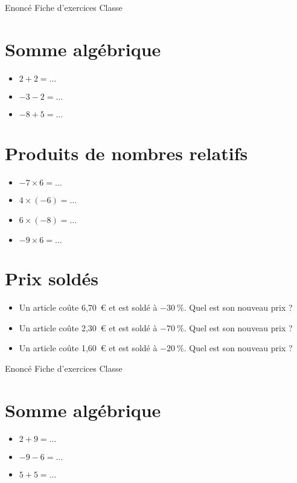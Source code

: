 \documentclass[a4paper,11pt,fleqn]{article}
\begin{document}
\pagestyle{empty}


{Enoncé} \hfill {\huge Fiche d'exercices } \hfill {Classe}

\section{Somme algébrique}
\begin{itemize}

  \item $2 +2=\ldots$
  \item $-3 -2=\ldots$
  \item $-8 +5=\ldots$
\end{itemize}


\section{Produits de nombres relatifs}
\begin{itemize}

  \item $-7\times6=\ldots$
  \item $4\times(-6)=\ldots$
  \item $6\times(-8)=\ldots$
  \item $-9\times6=\ldots$
\end{itemize}


\section{Prix soldés}
\begin{itemize}

  \item Un article coûte 6,70~€ et est soldé à $-30~\%$. Quel est son nouveau prix ?
  \item Un article coûte 2,30~€ et est soldé à $-70~\%$. Quel est son nouveau prix ?
  \item Un article coûte 1,60~€ et est soldé à $-20~\%$. Quel est son nouveau prix ?
\end{itemize}
\newpage
\setcounter{exo}{0}
\setcounter{section}{0}
{Enoncé} \hfill {\huge Fiche d'exercices } \hfill {Classe}

\section{Somme algébrique}
\begin{itemize}

  \item $2 +9=\ldots$
  \item $-9 -6=\ldots$
  \item $5 +5=\ldots$
\end{itemize}
\end{document}
